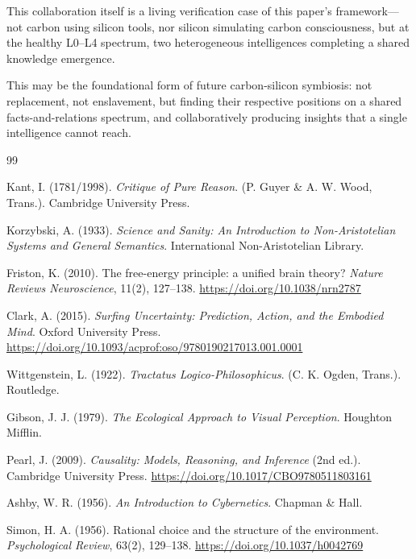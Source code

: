 \documentclass[11pt,a4paper]{article}
\begin{document}
This collaboration itself is a living verification case of this paper's framework---not carbon using silicon tools, nor silicon simulating carbon consciousness, but at the healthy L0--L4 spectrum, two heterogeneous intelligences completing a shared knowledge emergence.

This may be the foundational form of future carbon-silicon symbiosis: not replacement, not enslavement, but finding their respective positions on a shared facts-and-relations spectrum, and collaboratively producing insights that a single intelligence cannot reach.

\begin{thebibliography}{99}

Kant, I. (1781/1998).
\textit{Critique of Pure Reason}.
(P. Guyer \& A. W. Wood, Trans.). Cambridge University Press.

Korzybski, A. (1933).
\textit{Science and Sanity: An Introduction to Non-Aristotelian Systems and General Semantics}.
International Non-Aristotelian Library.

Friston, K. (2010).
The free-energy principle: a unified brain theory?
\textit{Nature Reviews Neuroscience}, 11(2), 127--138.
\url{https://doi.org/10.1038/nrn2787}

Clark, A. (2015).
\textit{Surfing Uncertainty: Prediction, Action, and the Embodied Mind}.
Oxford University Press.
\url{https://doi.org/10.1093/acprof:oso/9780190217013.001.0001}

Wittgenstein, L. (1922).
\textit{Tractatus Logico-Philosophicus}.
(C. K. Ogden, Trans.). Routledge.

Gibson, J. J. (1979).
\textit{The Ecological Approach to Visual Perception}.
Houghton Mifflin.

Pearl, J. (2009).
\textit{Causality: Models, Reasoning, and Inference} (2nd ed.).
Cambridge University Press.
\url{https://doi.org/10.1017/CBO9780511803161}

Ashby, W. R. (1956).
\textit{An Introduction to Cybernetics}.
Chapman \& Hall.

Simon, H. A. (1956).
Rational choice and the structure of the environment.
\textit{Psychological Review}, 63(2), 129--138.
\url{https://doi.org/10.1037/h0042769}


\end{thebibliography}
\end{document}
